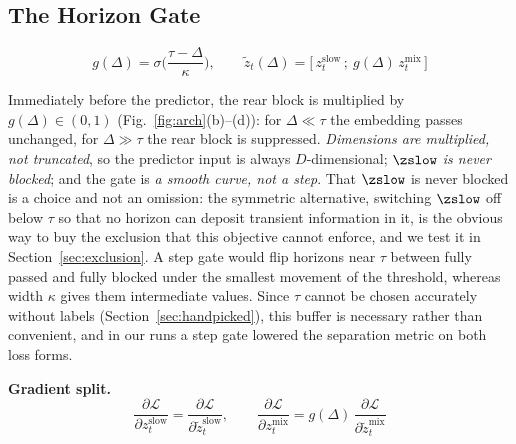 \subsection{The Horizon Gate}

\begin{equation}
g(\Delta) = \sigma\!\Big(\frac{\tau-\Delta}{\kappa}\Big), \qquad \tilde z_t(\Delta) = \big[\,z_t^{\mathrm{slow}}\,;\ g(\Delta)\,z_t^{\mathrm{mix}}\,\big]
\label{eq:gate}
\end{equation}

Immediately before the predictor, the rear block is multiplied by $g(\Delta)\in(0,1)$ (Fig.~\ref{fig:arch}(b)--(d)): for $\Delta\ll\tau$ the embedding passes unchanged, for $\Delta\gg\tau$ the rear block is suppressed. \emph{Dimensions are multiplied, not truncated}, so the predictor input is always $D$-dimensional; \emph{$\zslow$ is never blocked}; and the gate is \emph{a smooth curve, not a step}. That $\zslow$ is never blocked is a choice and not an omission: the symmetric alternative, switching $\zslow$ off below $\tau$ so that no horizon can deposit transient information in it, is the obvious way to buy the exclusion that this objective cannot enforce, and we test it in Section~\ref{sec:exclusion}. A step gate would flip horizons near $\tau$ between fully passed and fully blocked under the smallest movement of the threshold, whereas width $\kappa$ gives them intermediate values. Since $\tau$ cannot be chosen accurately without labels (Section~\ref{sec:handpicked}), this buffer is necessary rather than convenient, and in our runs a step gate lowered the separation metric on both loss forms.

\textbf{Gradient split.}
\begin{equation}
\frac{\partial\mathcal{L}}{\partial z_t^{\mathrm{slow}}} = \frac{\partial\mathcal{L}}{\partial \tilde z_t^{\mathrm{slow}}}, \qquad \frac{\partial\mathcal{L}}{\partial z_t^{\mathrm{mix}}} = g(\Delta)\,\frac{\partial\mathcal{L}}{\partial \tilde z_t^{\mathrm{mix}}}
\label{eq:grad}
\end{equation}

